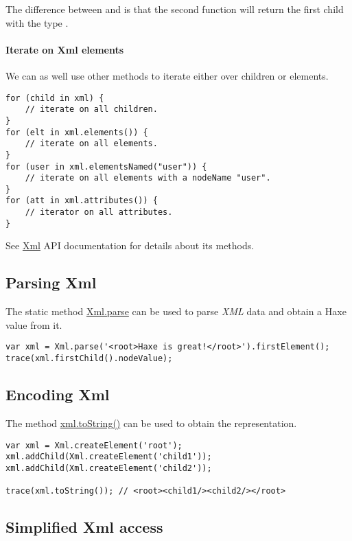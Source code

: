 The difference between  and  is that the second function will return the first child with the type . 

\paragraph{Iterate on Xml elements}
We can as well use other methods to iterate either over children or elements.
\begin{lstlisting}
for (child in xml) {
	// iterate on all children.
}
for (elt in xml.elements()) {
	// iterate on all elements.
}
for (user in xml.elementsNamed("user")) {
	// iterate on all elements with a nodeName "user".
}
for (att in xml.attributes()) {
	// iterator on all attributes.
}
\end{lstlisting}

See \href{https://api.haxe.org/Xml.html}{Xml} API documentation for details about its methods.


\subsection{Parsing Xml}
\label{std-Xml-parsing}

The static method \href{https://api.haxe.org/Xml.html#parse}{Xml.parse} can be used to parse \emph{XML} data and obtain a Haxe value from it.

\begin{lstlisting}
var xml = Xml.parse('<root>Haxe is great!</root>').firstElement();
trace(xml.firstChild().nodeValue);
\end{lstlisting}

\subsection{Encoding Xml}
\label{std-Xml-encoding}

The method \href{https://api.haxe.org/Xml.html#toString}{xml.toString()} can be used to obtain the  representation.
\begin{lstlisting}
var xml = Xml.createElement('root');
xml.addChild(Xml.createElement('child1'));
xml.addChild(Xml.createElement('child2'));

trace(xml.toString()); // <root><child1/><child2/></root>
\end{lstlisting}

\subsection{Simplified Xml access}
\label{std-Xml-simplified-access}

